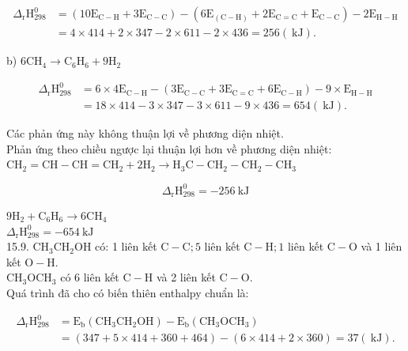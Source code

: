 \documentclass[10pt]{article}
\begin{document}
$$
\begin{aligned}
\Delta_{\mathrm{r}} \mathrm{H}_{298}^{0} & =\left(10 \mathrm{E}_{\mathrm{C}-\mathrm{H}}+3 \mathrm{E}_{\mathrm{C}-\mathrm{C}}\right)-\left(6 \mathrm{E}_{(\mathrm{C}-\mathrm{H})}+2 \mathrm{E}_{\mathrm{C}=\mathrm{C}}+\mathrm{E}_{\mathrm{C}-\mathrm{C}}\right)-2 \mathrm{E}_{\mathrm{H}-\mathrm{H}} \\
& =4 \times 414+2 \times 347-2 \times 611-2 \times 436=256(\mathrm{~kJ}) .
\end{aligned}
$$

b) $6 \mathrm{CH}_{4} \rightarrow \mathrm{C}_{6} \mathrm{H}_{6}+9 \mathrm{H}_{2}$

$$
\begin{aligned}
\Delta_{\mathrm{r}} \mathrm{H}_{298}^{0} & =6 \times 4 \mathrm{E}_{\mathrm{C}-\mathrm{H}}-\left(3 \mathrm{E}_{\mathrm{C}-\mathrm{C}}+3 \mathrm{E}_{\mathrm{C}=\mathrm{C}}+6 \mathrm{E}_{\mathrm{C}-\mathrm{H}}\right)-9 \times \mathrm{E}_{\mathrm{H}-\mathrm{H}} \\
& =18 \times 414-3 \times 347-3 \times 611-9 \times 436=654(\mathrm{~kJ}) .
\end{aligned}
$$

Các phản ứng này không thuận lợi về phương diện nhiệt.\\
Phản ứng theo chiều ngược lại thuận lợi hơn về phương diện nhiệt:\\
$\mathrm{CH}_{2}=\mathrm{CH}-\mathrm{CH}=\mathrm{CH}_{2}+2 \mathrm{H}_{2} \rightarrow \mathrm{H}_{3} \mathrm{C}-\mathrm{CH}_{2}-\mathrm{CH}_{2}-\mathrm{CH}_{3}$

$$
\Delta_{\mathrm{r}} \mathrm{H}_{298}^{0}=-256 \mathrm{~kJ}
$$

$9 \mathrm{H}_{2}+\mathrm{C}_{6} \mathrm{H}_{6} \rightarrow 6 \mathrm{CH}_{4}$\\
$\Delta_{\mathrm{r}} \mathrm{H}_{298}^{0}=-654 \mathrm{~kJ}$\\
15.9. $\mathrm{CH}_{3} \mathrm{CH}_{2} \mathrm{OH}$ có: 1 liên kết $\mathrm{C}-\mathrm{C} ; 5$ liên kết $\mathrm{C}-\mathrm{H} ; 1$ liên kết $\mathrm{C}-\mathrm{O}$ và 1 liên kết $\mathrm{O}-\mathrm{H}$.\\
$\mathrm{CH}_{3} \mathrm{OCH}_{3}$ có 6 liên kết $\mathrm{C}-\mathrm{H}$ và 2 liên kết $\mathrm{C}-\mathrm{O}$.\\
Quá trình đã cho có biến thiên enthalpy chuẩn là:

$$
\begin{aligned}
\Delta_{\mathrm{r}} \mathrm{H}_{298}^{0} & =\mathrm{E}_{\mathrm{b}}\left(\mathrm{CH}_{3} \mathrm{CH}_{2} \mathrm{OH}\right)-\mathrm{E}_{\mathrm{b}}\left(\mathrm{CH}_{3} \mathrm{OCH}_{3}\right) \\
& =(347+5 \times 414+360+464)-(6 \times 414+2 \times 360)=37(\mathrm{~kJ}) .
\end{aligned}
$$
\end{document}
